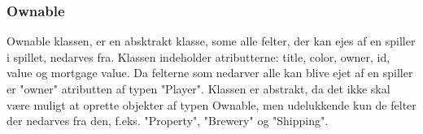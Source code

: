 \subsubsection{Ownable}
Ownable klassen, er en absktrakt klasse, some alle felter, der kan ejes af en spiller i spillet, nedarves fra. Klassen indeholder atributterne: title, color, owner, id, value og mortgage value. Da felterne som nedarver alle kan blive ejet af en spiller er "owner" atributten af typen "Player". Klassen er abstrakt, da det ikke skal være muligt at oprette objekter af typen Ownable, men udelukkende kun de felter der nedarves fra den, f.eks. "Property", "Brewery" og "Shipping".  